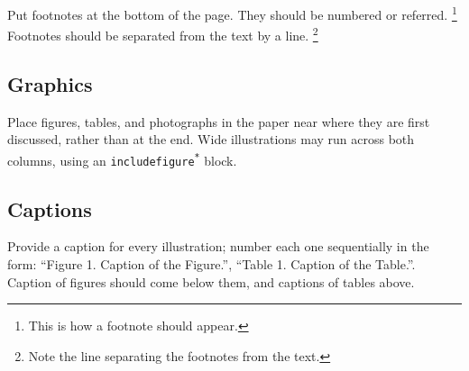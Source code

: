 \documentclass[10pt, a4paper]{article}
\begin{document}
Put footnotes at the bottom of the page.
They should be numbered or referred.
\footnote{This is how a footnote should appear.}
Footnotes should be separated from the text by a line.
\footnote{Note the line separating the footnotes from the text.}

\subsection{Graphics}
\label{subsec:graphics}

Place figures, tables, and photographs in the paper near
where they are first discussed, rather than at the end.
Wide illustrations may run across both columns, using an \texttt{includefigure\textsuperscript{*}} block.

\subsection{Captions}
\label{subsec:captions}

Provide a caption for every illustration; number each one
sequentially in the form: \enquote{Figure 1. Caption of the Figure.}, \enquote{Table 1. Caption of the Table.}.
Caption of figures should come below them, and captions of tables above. 
\end{document}
